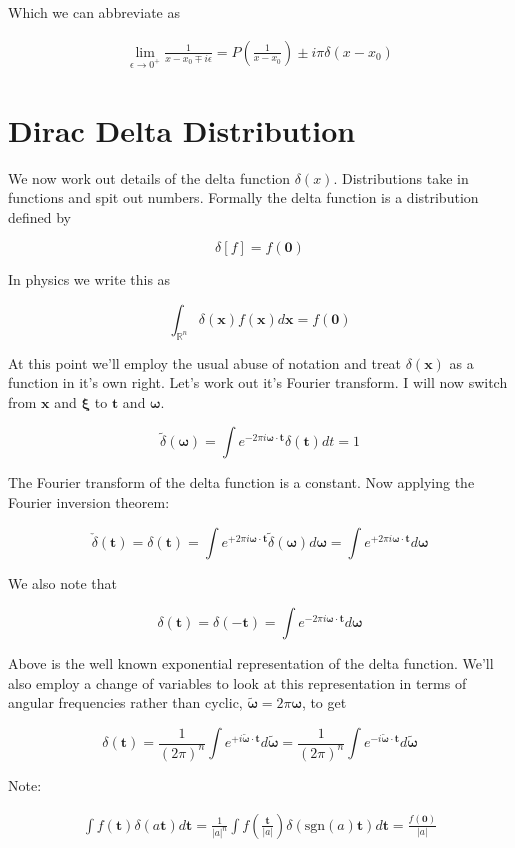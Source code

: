 \documentclass[12pt]{article}
\newcommand{\bv}[1]{\boldsymbol{#1}}
\begin{document}
Which we can abbreviate as

\begin{align}
\lim_{\epsilon \rightarrow 0^+} \frac{1}{x-x_0 \mp i \epsilon} = P\left(\frac{1}{x-x_0}\right) \pm i \pi \delta(x-x_0)
\end{align}

\section{Dirac Delta Distribution}
We now work out details of the delta function $\delta(x)$. Distributions take in functions and spit out numbers. Formally the delta function is a distribution defined by

\[ \delta[f] = f(\bv{0}) \]

In physics we write this as

\[ \int_{\mathbb{R}^n} \delta(\bv{x}) f(\bv{x}) d\bv{x} = f(\bv{0}) \]

At this point we'll employ the usual abuse of notation and treat $\delta(\bv{x})$ as a function in it's own right. Let's work out it's Fourier transform. I will now switch from $\bv{x}$ and $\bv{\xi}$ to $\bv{t}$ and $\bv{\omega}$.

\[
\tilde{\delta}(\bv{\omega}) = \int e^{-2\pi i \bv{\omega} \cdot \bv{t}} \delta(\bv{t}) dt = 1
\]

The Fourier transform of the delta function is a constant. Now applying the Fourier inversion theorem:

\[\check{\delta}(\bv{t}) = \delta(\bv{t}) = \int e^{+ 2\pi i \bv{\omega} \cdot \bv{t}} \tilde{\delta}(\bv{\omega}) d\bv{\omega} = \int e^{+ 2 \pi i \bv{\omega} \cdot \bv{t}} d\bv{\omega}\]

We also note that

\[ \delta(\bv{t}) = \delta(-\bv{t}) = \int e^{-2\pi i \bv{\omega} \cdot \bv{t}} d\bv{\omega} \]

Above is the well known exponential representation of the delta function. We'll also employ a change of variables to look at this representation in terms of angular frequencies rather than cyclic, $\tilde{\bv{\omega}} = 2\pi \bv{\omega}$, to get

\[
\delta(\bv{t}) = \frac{1}{\left(2\pi\right)^n} \int e^{+i \tilde{\bv{\omega}} \cdot \bv{t}} d\tilde{\bv{\omega}} = \frac{1}{\left(2\pi\right)^n}\int e^{-i \tilde{\bv{\omega}} \cdot \bv{t}} d\tilde{\bv{\omega}}
\]

Note:

\begin{align}
\int f(\bv{t}) \delta(a \bv{t}) d\bv{t} = \frac{1}{|a|^n}\int f\left(\frac{\bv{t}}{|a|}\right) \delta(\text{sgn}(a)\bv{t}) d\bv{t} = \frac{f(\bv{0})}{|a|}
\end{align}
\end{document}
